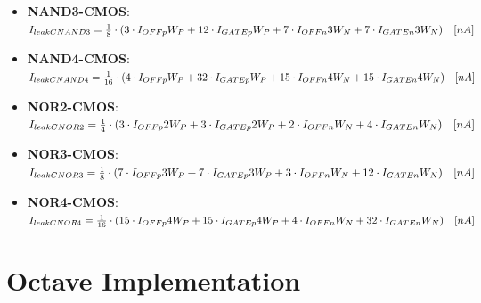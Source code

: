 \documentclass[12pt,  english, makeidx, a4paper, titlepage, oneside]{article}
\begin{document}
\begin{itemize}
\item \textbf{NAND3-CMOS}:\\
 $I_{leakCNAND3} ={1 \over 8}\cdot(3 \cdot I_{OFFp}W_P+12 \cdot I_{GATEp}W_P+7 \cdot I_{OFFn}3W_N+7 \cdot I_{GATEn}3W_N) \quad [nA]$

\item \textbf{NAND4-CMOS}:\\
$I_{leakCNAND4}= {1 \over 16}\cdot(4 \cdot I_{OFFp}W_P+32 \cdot I_{GATEp}W_P+15 \cdot I_{OFFn}4W_N+15 \cdot I_{GATEn}4W_N) \quad [nA]$

\item \textbf{NOR2-CMOS}:\\
$I_{leakCNOR2}={1 \over 4}\cdot(3 \cdot I_{OFFp}2W_P+3 \cdot I_{GATEp}2W_P+2 \cdot I_{OFFn}W_N+4 \cdot I_{GATEn}W_N) \quad [nA]$

\item \textbf{NOR3-CMOS}:\\
$I_{leakCNOR3}= {1 \over 8}\cdot(7 \cdot I_{OFFp}3W_P+7 \cdot I_{GATEp}3W_P+3 \cdot I_{OFFn}W_N+12 \cdot I_{GATEn}W_N) \quad [nA]$

\item \textbf{NOR4-CMOS}:\\
$I_{leakCNOR4}={1 \over 16}\cdot(15 \cdot I_{OFFp}4W_P+15 \cdot I_{GATEp}4W_P+4 \cdot I_{OFFn}W_N+32 \cdot I_{GATEn}W_N) \quad [nA]$

\end{itemize}
\newpage


\section{Octave Implementation}
\end{document}
